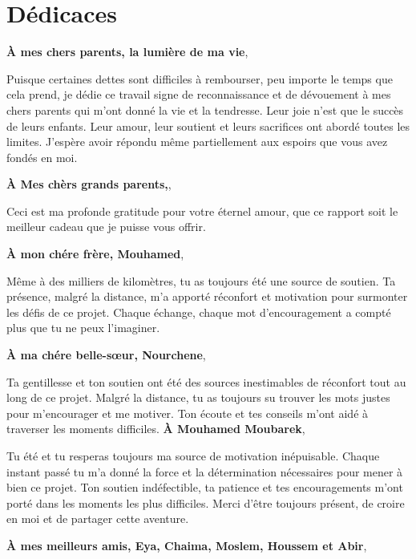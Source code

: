 \chapter*{Dédicaces}
\begin{center}
\center \textbf{À mes chers parents, la lumière de ma vie},
\vspace{1mm}

\normalsize Puisque certaines dettes sont difficiles à rembourser, peu importe le temps que cela prend, je dédie ce
travail signe de reconnaissance et de dévouement à mes chers parents qui m’ont donné la vie et la tendresse. Leur joie n’est que le succès de leurs enfants. Leur amour, leur soutient et leurs sacrifices ont
abordé toutes les limites. J’espère avoir répondu même partiellement aux espoirs que vous avez fondés
en moi.


\center \textbf{À Mes chèrs grands parents,},

\normalsize Ceci est ma profonde gratitude pour votre éternel amour, que ce rapport soit le meilleur cadeau que je
puisse vous offrir. 


\center \textbf{À mon chére frère, Mouhamed},

\normalsize Même à des milliers de kilomètres, tu as toujours été une source de soutien. Ta présence,
 malgré la distance, m'a apporté réconfort et motivation pour 
surmonter les défis de ce projet. Chaque échange, chaque mot d'encouragement a compté plus que tu ne peux l'imaginer.

 \center \textbf{À ma chére belle-sœur, Nourchene},
 
 \normalsize Ta gentillesse et ton soutien ont été des sources inestimables de réconfort tout 
 au long de ce projet. Malgré la distance, tu as toujours su trouver les mots justes pour m'encourager et me motiver.
  Ton écoute et tes conseils m'ont aidé à traverser les moments difficiles. 
\center \textbf{À Mouhamed Moubarek},

\normalsize Tu été et tu resperas toujours ma source de motivation inépuisable. Chaque instant passé tu m'a donné la force
 et la détermination nécessaires pour mener à bien ce projet. Ton soutien indéfectible, ta patience et tes 
 encouragements m'ont porté dans les moments les plus difficiles. Merci d'être toujours présent, de croire 
 en moi et de partager cette aventure.



\center \textbf{À mes meilleurs amis, Eya, Chaima, Moslem, Houssem et Abir},


\end{center}
